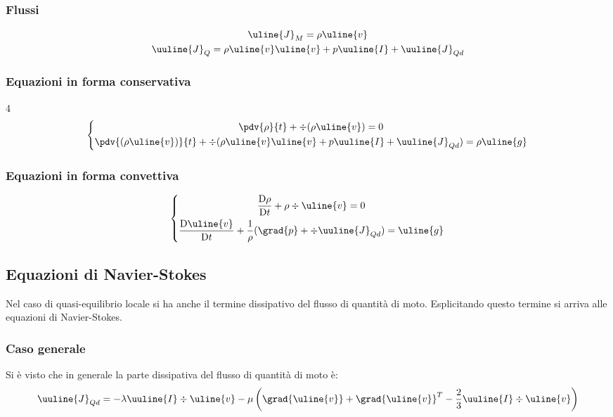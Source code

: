 \subsubsection{Flussi}
%
	\begin{equation*}
		\begin{gathered}
			\uline{J}_M = \rho \uline{v}\\
			\uuline{J}_Q = \rho \uline{v} \uline{v} + p \uuline{I} + \uuline{J}_{Qd}
		\end{gathered}
	\end{equation*}
%

\subsubsection{Equazioni in forma conservativa}4
%
	\begin{equation*}
		\left\{
			\begin{gathered}
				\pdv{\rho}{t} + \div{(\rho \uline{v})} = 0\\
				\pdv{(\rho \uline{v})}{t} + \div{(\rho \uline{v} \uline{v} + p \uuline{I} + \uuline{J}_{Qd})} = \rho \uline{g}
			\end{gathered}
		\right.
	\end{equation*}
%

\subsubsection{Equazioni in forma convettiva}
%
	\begin{equation*}
		\left\{
			\begin{gathered}
				\frac{\mathrm{D} \rho}{\mathrm{D} t} + \rho \div{\uline{v}} = 0\\
				\frac{\mathrm{D} \uline{v}}{\mathrm{D} t} + \frac{1}{\rho} (\grad{p} + \div{\uuline{J}_{Qd}}) = \uline{g}
			\end{gathered}
		\right.
	\end{equation*}
%

\subsection{Equazioni di Navier-Stokes}
Nel caso di quasi-equilibrio locale si ha anche il termine dissipativo del flusso di quantità di moto.
Esplicitando questo termine si arriva alle equazioni di Navier-Stokes.

\subsubsection{Caso generale}
Si è visto che in generale la parte dissipativa del flusso di quantità di moto è:
%
	\begin{equation*}
		\uuline{J}_{Qd} = - \lambda \uuline{I} \div{\uline{v}} - \mu \left( \grad{\uline{v}} + \grad{\uline{v}}^T - \frac{2}{3} \uuline{I} \div{\uline{v}} \right)
	\end{equation*}
%

